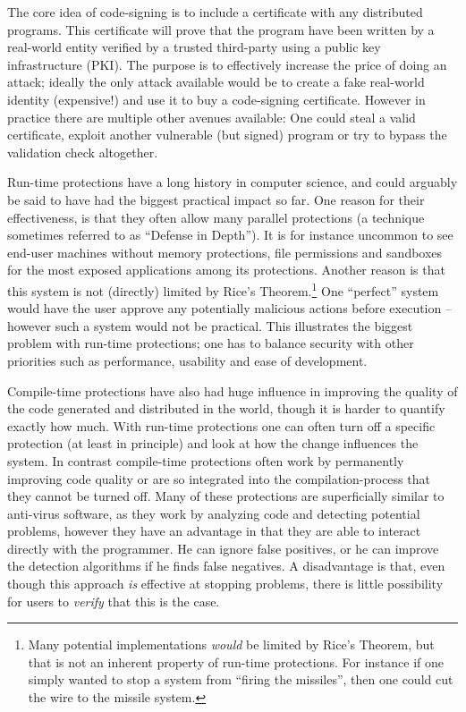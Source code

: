 The core idea of code-signing is to include a certificate with any distributed
programs. This certificate will prove that the program have been written by a
real-world entity verified by a trusted third-party using a public key
infrastructure (PKI). The purpose is to effectively increase the price of doing
an attack; ideally the only attack available would be to create a fake
real-world identity (expensive!) and use it to buy a code-signing
certificate. However in practice there are multiple other avenues available: One
could steal a valid certificate, exploit another vulnerable (but signed) program
or try to bypass the validation check altogether.

Run-time protections have a long history in computer science, and could arguably
be said to have had the biggest practical impact so far. One reason for their
effectiveness, is that they often allow many parallel protections (a technique
sometimes referred to as ``Defense in Depth''). It is for instance uncommon to
see end-user machines without memory protections, file permissions and sandboxes
for the most exposed applications among its protections. Another reason is that
this system is not (directly) limited by Rice's Theorem.\footnote{Many potential
  implementations \emph{would} be limited by Rice's Theorem, but that is not an
  inherent property of run-time protections. For instance if one simply wanted
  to stop a system from ``firing the missiles'', then one could cut the wire to
  the missile system.} One ``perfect'' system would have the user approve any
potentially malicious actions before execution -- however such a system would
not be practical. This illustrates the biggest problem with run-time
protections; one has to balance security with other priorities such as
performance, usability and ease of development.

Compile-time protections have also had huge influence in improving the quality
of the code generated and distributed in the world, though it is harder to
quantify exactly how much. With run-time protections one can often turn off a
specific protection (at least in principle) and look at how the change
influences the system. In contrast compile-time protections often work by
permanently improving code quality or are so integrated into the
compilation-process that they cannot be turned off. Many of these protections
are superficially similar to anti-virus software, as they work by analyzing code
and detecting potential problems, however they have an advantage in that they
are able to interact directly with the programmer. He can ignore false
positives, or he can improve the detection algorithms if he finds false
negatives. A disadvantage is that, even though this approach \emph{is} effective
at stopping problems, there is little possibility for users to \emph{verify}
that this is the case.


